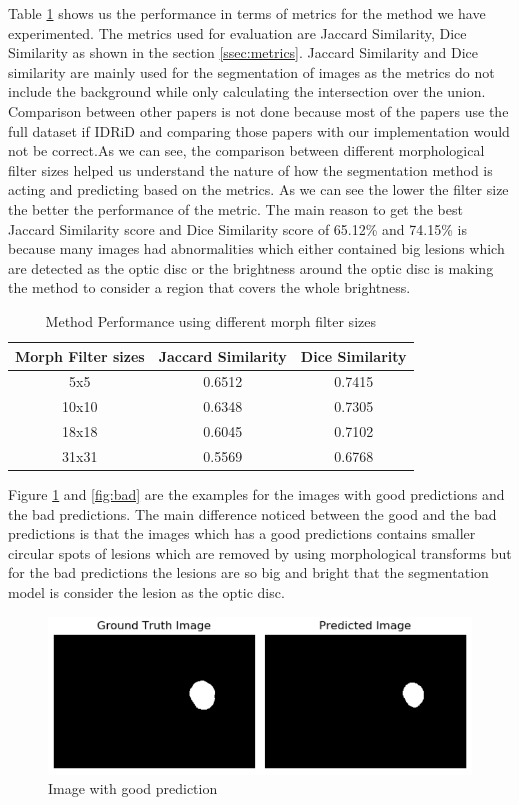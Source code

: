 \documentclass[conference]{IEEEtran}
\begin{document}
Table \ref{table:1} shows us the performance in terms of metrics for the method we have experimented. The metrics used for evaluation are Jaccard Similarity, Dice Similarity as shown in the section \ref{ssec:metrics}. Jaccard Similarity and Dice similarity are mainly used for the segmentation of images as the metrics do not include the background while only calculating the intersection over the union. Comparison between other papers is not done because most of the papers use the full dataset if IDRiD and comparing those papers with our implementation would not be correct.As we can see, the comparison between different morphological filter sizes helped us understand the nature of how the segmentation method is acting and predicting based on the metrics. As we can see the lower the filter size the better the performance of the metric. The main reason to get the best Jaccard Similarity score and Dice Similarity score of 65.12\% and 74.15\% is because many images had abnormalities which either contained big lesions which are detected as the optic disc or the brightness around the optic disc is making the method to consider a region that covers the whole brightness.

\begin{table}[H]
\centering
 \begin{tabular}{|c| c c|} 
 \hline
 Morph Filter sizes & Jaccard Similarity & Dice Similarity \\ [0.5ex] 
 \hline
 5x5 & 0.6512 & 0.7415\\ 
 \hline
 10x10 & 0.6348 & 0.7305\\
 \hline
 18x18 & 0.6045 & 0.7102\\
 \hline
 31x31 & 0.5569 & 0.6768\\
 \hline
\end{tabular}
\vspace*{0.25cm}
\caption{Method Performance using different morph filter sizes}
\label{table:1}
\end{table}

Figure \ref{fig:good} and \ref{fig:bad} are the examples for the images with good predictions and the bad predictions. The main difference noticed between the good and the bad predictions is that the images which has a good predictions contains smaller circular spots of lesions which are removed by using morphological transforms but for the bad predictions the lesions are so big and bright that the segmentation model is consider the lesion as the optic disc.

              
\begin{figure}[H]
	\centering
	\includegraphics[width=\linewidth]{images/good.PNG}
	\caption{Image with good prediction}
	\label{fig:good}
\end{figure}
  
\end{document}
